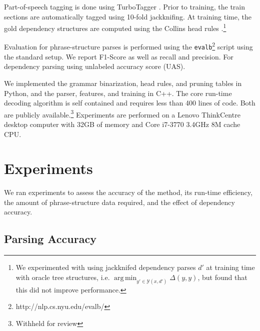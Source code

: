 \documentclass[11pt,letterpaper]{article}
\DeclareMathOperator*{\argmin}{arg\,min}
\begin{document}
Part-of-speech tagging is done using TurboTagger
\cite{martins2013turning}. Prior to training, the train sections are
automatically tagged using 10-fold jackknifing. At training time, the
gold dependency structures are computed using the Collins head rules
\cite{collins2003head}.\footnote{ We experimented with using
  jackknifed dependency parses $d'$ at training time with oracle tree
  structures, i.e. $\argmin_{y' \in \mathcal{Y}(x, d')} \Delta(y, y)$,
  but found that this did not improve performance.}

Evaluation for phrase-structure parses is performed using the
\texttt{evalb}\footnote{http://nlp.cs.nyu.edu/evalb/} script using the
standard setup. We report F1-Score as well as recall and
precision. For dependency parsing using unlabeled accuracy score
(UAS).

We implemented the grammar binarization, head rules, and pruning
tables in Python, and the parser, features, and training in C++. The
core run-time decoding algorithm is self contained and requires less
than 400 lines of code. Both are publicly available.\footnote{Withheld
  for review} Experiments are performed on a Lenovo ThinkCentre desktop computer
with 32GB of memory and  Core i7-3770 3.4GHz 8M cache CPU.

\section{Experiments}

We ran experiments to assess the accuracy of the method, its run-time efficiency, the amount of phrase-structure data required, and the effect of dependency accuracy.

\subsection{Parsing Accuracy}
\end{document}
